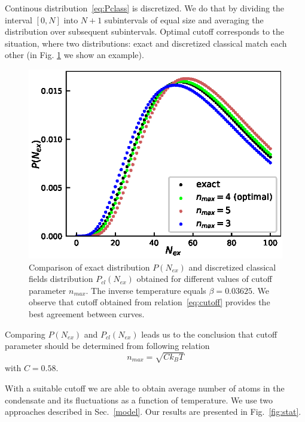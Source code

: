 \documentclass[aps,pra,reprint]{revtex4-2}
\begin{document}
Continous distribution~\eqref{eq:Pclass} is discretized. We do that by dividing 
the interval $[0,N]$ into $N+1$ subintervals of equal size and averaging the 
distribution over subsequent subintervals. Optimal cutoff corresponds to the 
situation, where two distributions:  exact and discretized classical match each 
other (in Fig. \ref{fig:comp} we show an example).    
\begin{figure}[h]
\includegraphics{fig1.eps}
\caption{Comparison of exact  distribution $P(N_{ex})$ and discretized 
classical fields distribution $P_{cl}(N_{ex})$ obtained for different values of 
cutoff parameter $n_{max}$. The inverse temperature equals $\beta=0.03625$. We 
observe that cutoff obtained from relation~\eqref{eq:cutoff} provides the best 
agreement between curves.}
\label{fig:comp}
\end{figure}

Comparing $P(N_{ex})$ and $P_{cl}(N_{ex})$ leads us to the conclusion that 
cutoff parameter should be determined from following relation
\begin{equation}
\label{eq:cutoff}
n_{max} = \sqrt{C k_{\textit{B}} T}
\end{equation}
with $C=0.58$. 

With a suitable cutoff we are able to obtain average number of atoms in the 
condensate and its fluctuations as a function of temperature. We use two 
approaches described in Sec.~\ref{model}. Our results 
are presented in Fig.~\ref{fig:stat}.
    
\end{document}
